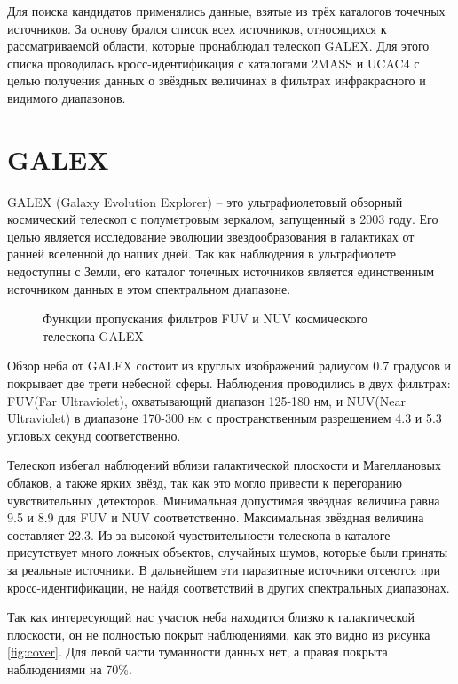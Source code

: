 Для поиска кандидатов применялись данные, взятые из трёх каталогов точечных источников. За основу брался список всех источников, относящихся к рассматриваемой области, которые пронаблюдал телескоп GALEX.
Для этого списка проводилась кросс-идентификация с каталогами 2MASS и UCAC4 с целью получения данных о звёздных величинах в фильтрах инфракрасного и видимого диапазонов. 


\section{GALEX}
GALEX (Galaxy Evolution Explorer) -- это ультрафиолетовый обзорный космический телескоп с полуметровым зеркалом, запущенный в 2003 году. Его целью является исследование эволюции звездообразования в галактиках от ранней вселенной до наших дней. Так как наблюдения в ультрафиолете недоступны с Земли, его каталог точечных источников является единственным источником данных в этом спектральном диапазоне.

\begin{figure}[ht]
\hfill
\caption{Функции пропускания фильтров FUV и NUV космического телескопа GALEX}
\label{fig:filters}
\end{figure}

Обзор неба от GALEX состоит из круглых изображений радиусом 0.7 градусов и покрывает две трети небесной сферы. Наблюдения проводились в двух фильтрах: FUV(Far Ultraviolet), охватывающий диапазон 125-180 нм, и NUV(Near Ultraviolet) в диапазоне 170-300 нм с пространственным разрешением 4.3 и 5.3 угловых секунд соответственно.

Телескоп избегал наблюдений вблизи галактической плоскости и Магеллановых облаков, а также ярких звёзд, так как это могло привести к перегоранию чувствительных детекторов. Минимальная допустимая звёздная величина равна 9.5 и 8.9 для FUV и NUV соответственно. Максимальная звёздная величина составляет 22.3. Из-за высокой чувствительности телескопа в каталоге присутствует много ложных объектов, случайных шумов, которые были приняты за реальные источники. В дальнейшем эти паразитные источники отсеются при кросс-идентификации, не найдя соответствий в других спектральных диапазонах.

Так как интересующий нас участок неба находится близко к галактической плоскости, он не полностью покрыт наблюдениями, как это видно из рисунка \ref{fig:cover}. Для левой части туманности данных нет, а правая покрыта наблюдениями на 70\%.

